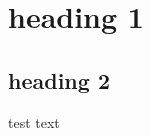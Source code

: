 \hypertarget{heading-1}{%
\section{heading 1}\label{heading-1}}

\hypertarget{heading-2}{%
\subsection{heading 2}\label{heading-2}}

test text
